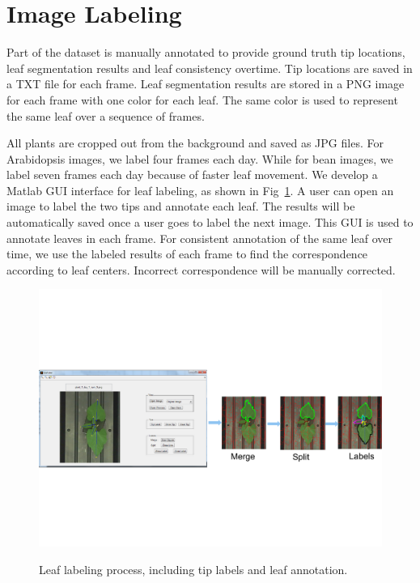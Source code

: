 \section{Image Labeling}

Part of the dataset is manually annotated to provide ground truth tip locations, leaf segmentation results and leaf consistency overtime.
Tip locations are saved in a TXT file for each frame. 
Leaf segmentation results are stored in a PNG image for each frame with one color for each leaf.
The same color is used to represent the same leaf over a sequence of frames.

All plants are cropped out from the background and saved as JPG files.
For Arabidopsis images, we label four frames each day.
While for bean images, we label seven frames each day because of faster leaf movement.
We develop a Matlab GUI interface for leaf labeling, as shown in Fig~\ref{fig:label}.
A user can open an image to label the two tips and annotate each leaf.
The results will be automatically saved once a user goes to label the next image.
This GUI is used to annotate leaves in each frame.
For consistent annotation of the same leaf over time, we use the labeled results of each frame to find the correspondence according to leaf centers.
Incorrect correspondence will be manually corrected.

\begin{figure}[h]
\centering
\includegraphics[width=.98\textwidth]{Figures/labeling}\\
\caption{Leaf labeling process, including tip labels and leaf annotation.}
\label{fig:label}
\end{figure}

